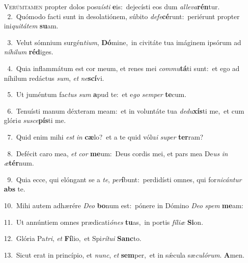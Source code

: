 \lettrine{\initial\textcolor{\initialcolor}{V}}{erúmtamen} propter dolos posu\-\textit{ís}\-\textit{ti} \textbf{e}\-is:~\star dejecísti eos dum \textit{al}\-\textit{le}\textit{va}\textbf{rén}tur.\\
{\numbfont\textcolor{\numbcolor}{~2.}}~Quómodo facti sunt in desolatiónem, súbito \textit{de}\-\textit{fe}\textbf{cé}runt:~\star periérunt propter ini\-\textit{qui}\-\textit{tá}\textit{tem} \textbf{su}\-am.\par
{\numbfont\textcolor{\numbcolor}{~3.}}~Velut sómnium surgén\-\textit{ti}\-\textit{um}, \textbf{Dó}\-mine,~\star in civitáte tua imáginem ipsórum ad \textit{ní}\-\textit{hi}\textit{lum} \textbf{réd}\-iges.\par
{\numbfont\textcolor{\numbcolor}{~4.}}~Quia inflammátum est cor meum, et renes mei \textit{com}\-\textit{mu}\textbf{tá}ti sunt:~\star et ego ad níhilum redáctus \textit{sum}\-, \textit{et} \textit{ne}\-\textbf{scí}vi.\par
{\numbfont\textcolor{\numbcolor}{~5.}}~Ut juméntum fac\textit{tus} \textit{sum} \textbf{a}\-pud te:~\star et e\textit{go} \textit{sem}\-\textit{per} \textbf{te}\-cum.\par
{\numbfont\textcolor{\numbcolor}{~6.}}~Tenuísti manum déxteram meam:~\dagger et in voluntáte tua \textit{de}\-\textit{du}\textbf{xís}ti me,~\star et cum glóri\textit{a} \textit{su}\-\textit{sce}\textbf{pís}ti me.\par
{\numbfont\textcolor{\numbcolor}{~7.}}~Quid enim mihi \textit{est} \textit{in} \textbf{cæ}\-lo?~\star et a te quid vólu\textit{i} \textit{su}\-\textit{per} \textbf{ter}\-ram?\par
{\numbfont\textcolor{\numbcolor}{~8.}}~Defécit caro mea, \textit{et} \textit{cor} \textbf{me}\-um:~\star Deus cordis mei, et pars mea De\textit{us} \textit{in} \textit{æ}\-\textbf{tér}num.\par
{\numbfont\textcolor{\numbcolor}{~9.}}~Quia ecce, qui elóngant se a \textit{te}\-, \textit{per}\-\textbf{í}bunt:~\star perdidísti omnes, qui for\-\textit{ni}\-\textit{cán}\textit{tur} \textbf{abs} te.\par
{\numbfont\textcolor{\numbcolor}{10.}}~Mihi autem adhærére \textit{De}\-\textit{o} \textbf{bo}\-num est:~\star pónere in Dómino \textit{De}\-\textit{o} \textit{spem} \textbf{me}\-am:\par
{\numbfont\textcolor{\numbcolor}{11.}}~Ut annúntiem omnes prædicati\-\textit{ó}\-\textit{nes} \textbf{tu}\-as,~\star in portis \textit{fí}\-\textit{li}\textit{æ} \textbf{Si}\-on.\par
{\numbfont\textcolor{\numbcolor}{12.}}~Glória Pa\-\textit{tri}\-, \textit{et} \textbf{Fí}\-lio,~\star et Spi\-\textit{rí}\-\textit{tu}\textit{i} \textbf{Sanc}\-to.\par
{\numbfont\textcolor{\numbcolor}{13.}}~Sicut erat in princípio, et \textit{nunc}\-, \textit{et} \textbf{sem}\-per,~\star et in sǽcula sæ\-\textit{cu}\-\textit{ló}\textit{rum}. \textbf{A}\-men.\par
